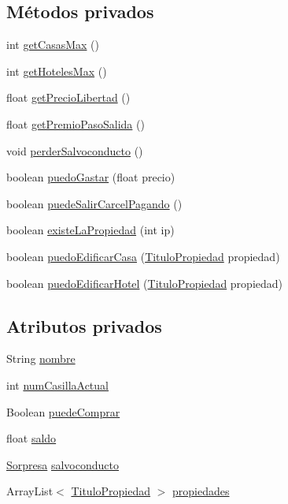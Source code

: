 \subsection*{Métodos privados}
\begin{DoxyCompactItemize}
\item 
int \hyperlink{classcivitas_1_1Jugador_a53bb212c80e5478ee456aac4e80c3aca}{get\+Casas\+Max} ()
\item 
int \hyperlink{classcivitas_1_1Jugador_adcb057e3337f0c727184071a8b8374f8}{get\+Hoteles\+Max} ()
\item 
float \hyperlink{classcivitas_1_1Jugador_a7efefdcbd0fc0d10e113a605c0251e2b}{get\+Precio\+Libertad} ()
\item 
float \hyperlink{classcivitas_1_1Jugador_a2640c1b6ddf6f07a2d11012b51f05910}{get\+Premio\+Paso\+Salida} ()
\item 
void \hyperlink{classcivitas_1_1Jugador_a121e27109e4f746fd129175b1622c154}{perder\+Salvoconducto} ()
\item 
boolean \hyperlink{classcivitas_1_1Jugador_a459494b841c3ac2c9d93b00307292d89}{puedo\+Gastar} (float precio)
\item 
boolean \hyperlink{classcivitas_1_1Jugador_a4a001e328396bc37afa704a71a0f236f}{puede\+Salir\+Carcel\+Pagando} ()
\item 
boolean \hyperlink{classcivitas_1_1Jugador_a5ae51ea0cc7dd26a7db41fe6cd96dd87}{existe\+La\+Propiedad} (int ip)
\item 
boolean \hyperlink{classcivitas_1_1Jugador_a471ecc3440579578a91e2eb5cf3a7acc}{puedo\+Edificar\+Casa} (\hyperlink{classcivitas_1_1TituloPropiedad}{Titulo\+Propiedad} propiedad)
\item 
boolean \hyperlink{classcivitas_1_1Jugador_ab5a6f51daa7036633cfba1f68b653228}{puedo\+Edificar\+Hotel} (\hyperlink{classcivitas_1_1TituloPropiedad}{Titulo\+Propiedad} propiedad)
\end{DoxyCompactItemize}
\subsection*{Atributos privados}
\begin{DoxyCompactItemize}
\item 
String \hyperlink{classcivitas_1_1Jugador_a15303963c4d14ce30464ed4fd4d89e01}{nombre}
\item 
int \hyperlink{classcivitas_1_1Jugador_ae8c1f9b2e7645e174f1e774ae0322528}{num\+Casilla\+Actual}
\item 
Boolean \hyperlink{classcivitas_1_1Jugador_a0623b0de7503538559075f1b89e8c2d7}{puede\+Comprar}
\item 
float \hyperlink{classcivitas_1_1Jugador_a5af09f8e331ff80dd432f89a3024c5ec}{saldo}
\item 
\hyperlink{classcivitas_1_1Sorpresa}{Sorpresa} \hyperlink{classcivitas_1_1Jugador_ad5cc928f36c930703bec36ee0be85132}{salvoconducto}
\item 
Array\+List$<$ \hyperlink{classcivitas_1_1TituloPropiedad}{Titulo\+Propiedad} $>$ \hyperlink{classcivitas_1_1Jugador_a037fa4dda1033ad869d6a9b61feb00af}{propiedades}
\end{DoxyCompactItemize}
